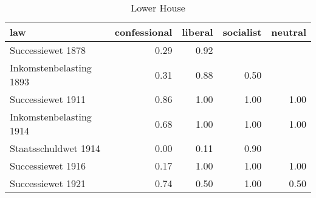 \begin{table}[ht]
\centering
\begin{tabular}{lrrrr}
  \hline
law & confessional & liberal & socialist & neutral \\ 
  \hline
Successiewet 1878 & 0.29 & 0.92 &  &  \\ 
  Inkomstenbelasting 1893 & 0.31 & 0.88 & 0.50 &  \\ 
  Successiewet 1911 & 0.86 & 1.00 & 1.00 & 1.00 \\ 
  Inkomstenbelasting 1914 & 0.68 & 1.00 & 1.00 & 1.00 \\ 
  Staatsschuldwet 1914 & 0.00 & 0.11 & 0.90 &  \\ 
  Successiewet 1916 & 0.17 & 1.00 & 1.00 & 1.00 \\ 
  Successiewet 1921 & 0.74 & 0.50 & 1.00 & 0.50 \\ 
   \hline
\end{tabular}
\caption{Lower House} 
\end{table}
